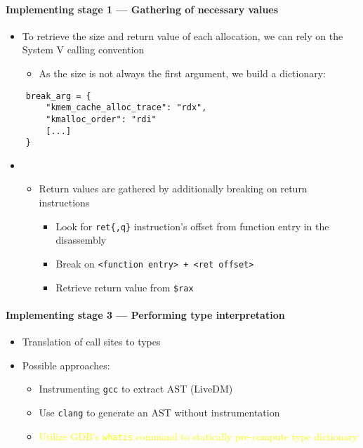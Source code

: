 \documentclass{i20lecture}
\begin{document}
\begin{frame}[fragile]{\insertsection}
  \framesubtitle{Implementing stage 1 --- Gathering of necessary values}

    \begin{itemize}
     \item To retrieve the size and return value of each allocation, we can rely on the System V calling convention
\pause
     \begin{itemize}
      \item As the size is not always the first argument, we build a dictionary:
     \end{itemize}
    \end{itemize}
    \begin{lstlisting}
    break_arg = {
        "kmem_cache_alloc_trace": "rdx",
        "kmalloc_order": "rdi"
        [...]
    }
    \end{lstlisting}
\pause
	\begin{itemize}
	\item[]
	\begin{itemize}
		\item Return values are gathered by additionally breaking on return instructions
		\pause
		\begin{itemize}
			\item Look for \lstinline|ret{,q}| instruction's offset from function entry in the disassembly
			\pause
			\item Break on \lstinline|<function entry> + <ret offset>|
			\pause
			\item Retrieve return value from \lstinline|$rax|
		\end{itemize}
	\end{itemize}
	\end{itemize}
\end{frame}

\begin{frame}[fragile]{\insertsection}
  \framesubtitle{Implementing stage 3 --- Performing type interpretation}
    \begin{itemize}
     \item Translation of call sites to types
	 \pause
     \item Possible approaches:
     \begin{itemize}
\pause
      \item Instrumenting \lstinline|gcc| to extract AST (LiveDM)
\pause
      \item Use \lstinline|clang| to generate an AST without instrumentation
\pause
	  \item \textcolor{yellow}{Utilize GDB's \lstinline|whatis| command to statically pre-compute type dictionary}
     \end{itemize}
    \end{itemize}
\end{frame}
\end{document}

